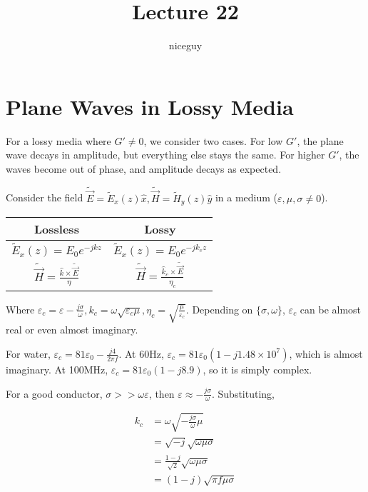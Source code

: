 \documentclass[12pt]{article}
\title{Lecture 22}
\author{niceguy}
\begin{document}
\maketitle

\section{Plane Waves in Lossy Media}

For a lossy media where $G' \ne 0$, we consider two cases. For low $G'$, the plane wave decays in amplitude, but everything else stays the same. For higher $G'$, the waves become out of phase, and amplitude decays as expected.

\begin{ex}
    Consider the field $\tilde{\vec E} = \tilde E_x(z)\hat x, \tilde{\vec H} = \tilde H_y(z)\hat y$ in a medium ($\varepsilon, \mu, \sigma \ne 0$).
    \begin{center}
        \begin{tabular}{c|c}
            Lossless & Lossy \\
            \hline
            $\tilde E_x(z) = E_0e^{-jkz}$ & $\tilde E_x(z) = E_0e^{-jk_cz}$ \\
            \hline
            $\tilde{\vec H} = \frac{\hat k \times \tilde{\vec E}}{\eta}$ & $\tilde{\vec H} = \frac{\hat k_c \times \tilde{\vec E}}{\eta_c}$ \\
        \end{tabular}
    \end{center}

    Where $\varepsilon_c = \varepsilon - \frac{j\sigma}{\omega}, k_c = \omega\sqrt{\varepsilon_c\mu}, \eta_c = \sqrt{\frac{\mu}{\varepsilon_c}}$. Depending on $\{\sigma,\omega\}$, $\varepsilon_c$ can be almost real or even almost imaginary.
\end{ex}

\begin{ex}
    For water, $\varepsilon_c = 81\varepsilon_0 - \frac{j4}{2\pi f}$. At 60Hz, $\varepsilon_c = 81\varepsilon_0(1 - j1.48\times10^7)$, which is almost imaginary. At 100MHz, $\varepsilon_c = 81\varepsilon_0(1 - j8.9)$, so it is simply complex.
\end{ex}

For a good conductor, $\sigma >> \omega\varepsilon$, then $\varepsilon \approx -\frac{j\sigma}{\omega}$. Substituting,

\begin{align*}
    k_c &= \omega\sqrt{-\frac{j\sigma}{\omega}\mu} \\
        &= \sqrt{-j}\sqrt{\omega\mu\sigma} \\
        &= \frac{1-j}{\sqrt{2}}\sqrt{\omega\mu\sigma} \\
        &= (1-j)\sqrt{\pi f\mu\sigma}
\end{align*}
\end{document}
